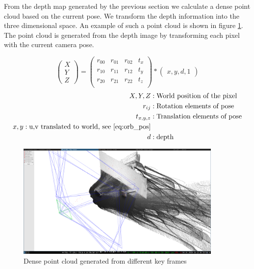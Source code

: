 \documentclass[11pt,a4paper,titlepage,oneside]{report}
\begin{document}
From the depth map generated by the previous section we calculate a dense point cloud based on the current pose. We transform the depth information into the three dimensional space. An example of such a point cloud is shown in figure \ref{fig:pointcloud}. The point cloud is generated from the depth image by transforming each pixel with the current camera pose.

\begin{equation}\label{eq:point_cloud_depth}
	\begin{pmatrix}
			X \\
			Y \\
			Z
	\end{pmatrix}=
	\begin{pmatrix}
		r_{00} & r_{01} & r_{02} & t_x \\
		r_{10} & r_{11} & r_{12} & t_y \\
		r_{20} & r_{21} & r_{22} & t_z \\
	\end{pmatrix}*
	\begin{pmatrix}
		x,
		y,
		d,
		1
	\end{pmatrix}
\end{equation}
\begin{align*}
	X,Y,Z &:			\text{World position of the pixel}\\
	r_{ij} &:			\text{Rotation elements of pose}\\
	t_{x,y,z} &:	\text{Translation elements of pose}\\
	x,y:					\text{u,v translated to world, see \ref{eq:orb_pos}}\\
	d &:					\text{depth}
\end{align*}

\begin{figure}[H]
  \begin{center}
		\includegraphics[width=0.9\textwidth]{img/pointcloud.png}
  \end{center}
	\caption{Dense point cloud generated from different key frames}\label{fig:pointcloud}
\end{figure}
\end{document}
